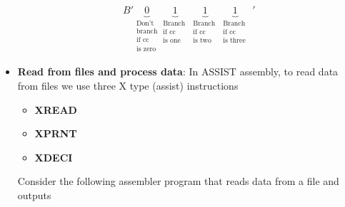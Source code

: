 \documentclass{report}
\begin{document}
\begin{itemize}
                    \begin{align*}
                        B' \underbrace{0}_{\begin{array}{c}
                                \text{Don't} \\
                                \text{branch} \\
                                \text{if cc}\\
                                \text{is zero}
                        \end{array}}
                        \underbrace{1}_{\begin{array}{c}
                                \text{Branch } \\
                                \text{if cc} \\
                                \text{is one}
                        \end{array}}
                        \underbrace{1}_{\begin{array}{c}
                                \text{Branch } \\
                                \text{if cc} \\
                                \text{is two}
                        \end{array}}
                        \underbrace{1}_{\begin{array}{c}
                                \text{Branch } \\
                                \text{if cc} \\
                                \text{is three}
                        \end{array}} \ '
                    \end{align*}
                \item \textbf{Read from files and process data}: In ASSIST assembly, to read data from files we use three X type (assist) instructions
                    \begin{itemize}
                        \item \textbf{XREAD}
                        \item \textbf{XPRNT}
                        \item \textbf{XDECI}
                    \end{itemize}
                    \bigbreak \noindent 
                    Consider the following assembler program that reads data from a file and outputs
                    \bigbreak \noindent 

\end{itemize}
\end{document}
